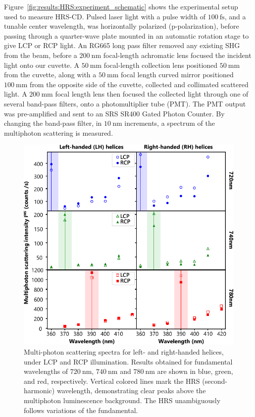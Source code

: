 Figure~\ref{fig:results:HRS:experiment_schematic} shows the experimental setup used to measure HRS-CD. 
Pulsed laser light with a pulse width of $\SI{100}{\femto\s}$, and a tunable center wavelength, was horizontally polarized (p-polarization), before passing through a quarter-wave plate mounted in an automatic rotation stage to give LCP or RCP light. An RG665 long pass filter removed any existing SHG from the beam, before a $\SI{200}{\nano\m}$ focal-length achromatic lens focused the incident light onto our cuvette. A $\SI{50}{\milli\m}$ focal-length collection lens positioned $\SI{50}{\milli\m}$ from the cuvette, along with a $\SI{50}{\milli\m}$ focal length curved mirror positioned $\SI{100}{\milli\m}$ from the opposite side of the cuvette, collected and collimated scattered light. A $\SI{200}{\milli\m}$ focal length lens then focused the collected light through one of several band-pass filters, onto a photomultiplier tube (PMT). The PMT output was pre-amplified and sent to an SRS SR400 Gated Photon Counter. 
By changing the band-pass filter, in $\SI{10}{\nano\m}$ increments, a spectrum of the multiphoton scattering is measured.

\begin{figure}[htb!]	
    \centering	
    \includegraphics[scale=1]{./figures/results/HRS/hrs_data.pdf}
    \caption{\label{fig:results:HRS:hrs_data}
    Multi-photon scattering spectra for left- and right-handed helices, under LCP and RCP illumination. Results obtained for fundamental wavelengths of $\SI{720}{\nano\m}$, $\SI{740}{\nano\m}$ and $\SI{780}{\nano\m}$ are shown in blue, green, and red, respectively. Vertical colored lines mark the HRS (second-harmonic) wavelength, demonstrating clear peaks above the multiphoton luminescence background. The HRS unambiguously follows variations of the fundamental. }	
\end{figure}

